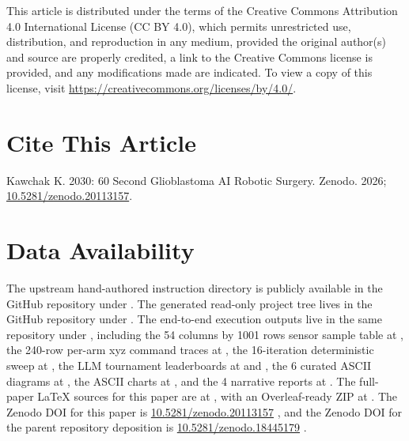 This article is distributed under the terms of the Creative Commons
Attribution 4.0 International License (CC BY 4.0), which permits
unrestricted use, distribution, and reproduction in any medium,
provided the original author(s) and source are properly credited, a
link to the Creative Commons license is provided, and any
modifications made are indicated. To view a copy of this license,
visit \url{https://creativecommons.org/licenses/by/4.0/}.

{}
\section*{Cite This Article}
\label{sec:cite}

Kawchak K. 2030: 60 Second Glioblastoma AI Robotic Surgery. Zenodo.
2026; \href{https://doi.org/10.5281/zenodo.20113157}{10.5281/zenodo.20113157}.

{}
\section*{Data Availability}
\label{sec:data}

The upstream hand-authored instruction directory is publicly available
in the  GitHub
repository under
\cite{one-minute-variant-instructions}. The generated read-only
project tree lives in the  GitHub
repository under 
\cite{repo-robotic-surgeries}. The end-to-end execution outputs live
in the same repository under , including
the 54 columns by 1001 rows sensor sample table at
, the
240-row per-arm xyz command traces at
, the 16-iteration
deterministic sweep at , the
LLM tournament leaderboards at
 and
, the 6 curated
ASCII diagrams at , the ASCII
charts at , and the 4 narrative
reports at . The full-paper
LaTeX sources for this paper are at
, with an Overleaf-ready ZIP at
. The
Zenodo DOI for this paper is
\href{https://doi.org/10.5281/zenodo.20113157}{10.5281/zenodo.20113157}
\cite{kawchak_2026_20113157}, and the Zenodo DOI for the parent
repository deposition is
\href{https://doi.org/10.5281/zenodo.18445179}{10.5281/zenodo.18445179}
\cite{repo-robotic-surgeries}.
